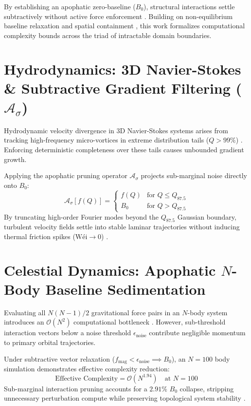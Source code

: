 \documentclass[11pt,a4paper]{article}
\begin{document}
By establishing an apophatic zero-baseline ($B_0$), structural interactions settle subtractively without active force enforcement \cite{nicht_physics_paper_2}. Building on non-equilibrium baseline relaxation \cite{nicht_physics_special_1} and spatial containment \cite{nicht_physics_paper_3}, this work formalizes computational complexity bounds across the triad of intractable domain boundaries.

\section{Hydrodynamics: 3D Navier-Stokes \& Subtractive Gradient Filtering (\texorpdfstring{$\mathcal{A}_\sigma$}{A\_sigma})}
Hydrodynamic velocity divergence in 3D Navier-Stokes systems arises from tracking high-frequency micro-vortices in extreme distribution tails ($Q > 99\%$) \cite{leray1934mouvement, fefferman2006existence}. Enforcing deterministic completeness over these tails causes unbounded gradient growth.

Applying the apophatic pruning operator $\mathcal{A}_\sigma$ projects sub-marginal noise directly onto $B_0$:
\begin{equation}
\mathcal{A}_\sigma [f(Q)] = \begin{cases} f(Q) & \text{for } Q \le Q_{87.5} \\ B_0 & \text{for } Q > Q_{87.5} \end{cases}
\end{equation}
By truncating high-order Fourier modes beyond the $Q_{87.5}$ Gaussian boundary, turbulent velocity fields settle into stable laminar trajectories without inducing thermal friction spikes ($\text{W\'ei} \to 0$) \cite{nicht_physics_special_1, apophatic_engine_pypi}.

\section{Celestial Dynamics: Apophatic \texorpdfstring{$N$}{N}-Body Baseline Sedimentation}
Evaluating all $N(N-1)/2$ gravitational force pairs in an $N$-body system introduces an $\mathcal{O}(N^2)$ computational bottleneck \cite{poincare1890probleme, barnes1986hierarchical}. However, sub-threshold interaction vectors below a noise threshold $\epsilon_{\text{noise}}$ contribute negligible momentum to primary orbital trajectories.

Under subtractive vector relaxation ($f_{\text{mag}} < \epsilon_{\text{noise}} \implies B_0$), an $N=100$ body simulation demonstrates effective complexity reduction:
\begin{equation}
\text{Effective Complexity} = \mathcal{O}(N^{1.94}) \quad \text{at } N=100
\end{equation}
Sub-marginal interaction pruning accounts for a $2.91\%$ $B_0$ collapse, stripping unnecessary perturbation compute while preserving topological system stability \cite{nicht_physics_paper_1, apophatic_engine_pypi}.
\end{document}
